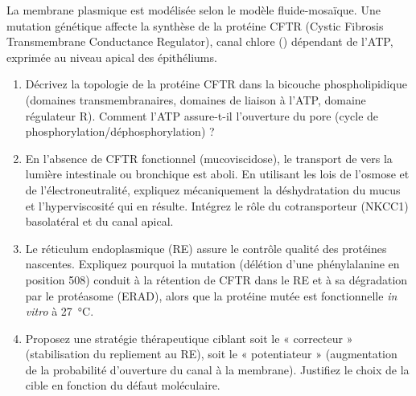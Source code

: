 \documentclass[11pt]{article}
\begin{document}
\begin{exercice}
La membrane plasmique est modélisée selon le modèle fluide-mosaïque. Une mutation génétique affecte la synthèse de la protéine CFTR (Cystic Fibrosis Transmembrane Conductance Regulator), canal chlore () dépendant de l'ATP, exprimée au niveau apical des épithéliums.
\begin{enumerate}
    \item Décrivez la topologie de la protéine CFTR dans la bicouche phospholipidique (domaines transmembranaires, domaines de liaison à l'ATP, domaine régulateur R). Comment l'ATP assure-t-il l'ouverture du pore (cycle de phosphorylation/déphosphorylation) ?
    \item En l'absence de CFTR fonctionnel (mucoviscidose), le transport de  vers la lumière intestinale ou bronchique est aboli. En utilisant les lois de l'osmose et de l'électroneutralité, expliquez mécaniquement la déshydratation du mucus et l'hyperviscosité qui en résulte. Intégrez le rôle du cotransporteur  (NKCC1) basolatéral et du canal  apical.
    \item Le réticulum endoplasmique (RE) assure le contrôle qualité des protéines nascentes. Expliquez pourquoi la mutation  (délétion d'une phénylalanine en position 508) conduit à la rétention de CFTR dans le RE et à sa dégradation par le protéasome (ERAD), alors que la protéine mutée est fonctionnelle \textit{in vitro} à \SI{27}{\celsius}.
    \item Proposez une stratégie thérapeutique ciblant soit le « correcteur » (stabilisation du repliement au RE), soit le « potentiateur » (augmentation de la probabilité d'ouverture du canal à la membrane). Justifiez le choix de la cible en fonction du défaut moléculaire.
\end{enumerate}
\end{exercice}
\end{document}
